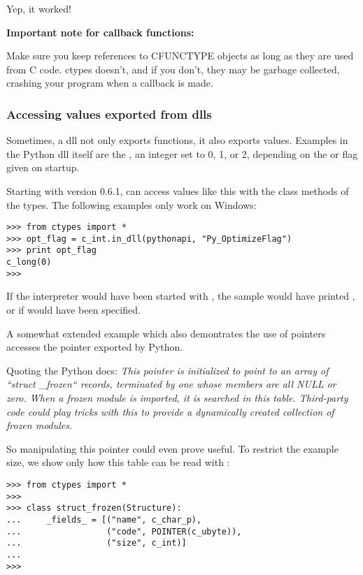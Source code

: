 Yep, it worked!

\textbf{Important note for callback functions:}

Make sure you keep references to CFUNCTYPE objects as long as they are
used from C code. ctypes doesn't, and if you don't, they may be
garbage collected, crashing your program when a callback is made.


\subsubsection{Accessing values exported from dlls\label{ctypes-accessing-values-exported-from-dlls}}

Sometimes, a dll not only exports functions, it also exports
values. Examples in the Python dll itself are the ,
an integer set to 0, 1, or 2, depending on the  or  flag
given on startup.

Starting with version 0.6.1,  can access values like this
with the  class methods of the types. The following examples
only work on Windows:
\begin{verbatim}
>>> from ctypes import *
>>> opt_flag = c_int.in_dll(pythonapi, "Py_OptimizeFlag")
>>> print opt_flag
c_long(0)
>>>
\end{verbatim}

If the interpreter would have been started with , the sample
would have printed , or  if  would have
been specified.

A somewhat extended example which also demontrates the use of pointers
accesses the  pointer exported by Python.

Quoting the Python docs: \emph{This pointer is initialized to point to an
array of ``struct {\_}frozen`` records, terminated by one whose members
are all NULL or zero. When a frozen module is imported, it is searched
in this table. Third-party code could play tricks with this to provide
a dynamically created collection of frozen modules.}

So manipulating this pointer could even prove useful. To restrict the
example size, we show only how this table can be read with
:
\begin{verbatim}
>>> from ctypes import *
>>>
>>> class struct_frozen(Structure):
...     _fields_ = [("name", c_char_p),
...                 ("code", POINTER(c_ubyte)),
...                 ("size", c_int)]
...
>>>
\end{verbatim}

